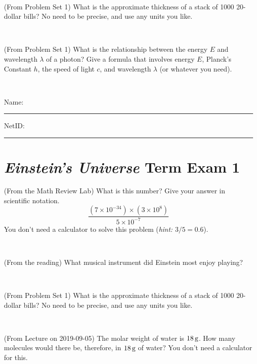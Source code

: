 \documentclass[12pt, letterpaper]{article}
\begin{document}
\vfill ~

\begin{problem} (From Problem Set 1)
What is the approximate thickness of a stack of 1000 20-dollar bills?
No need to be precise, and use any units you like.
\end{problem}


\vfill ~

\begin{problem} (From Problem Set 1)
What is the relationship between the energy $E$ and wavelength
$\lambda$ of a photon? Give a formula that involves energy $E$,
Planck's Constant $h$, the speed of light $c$, and wavelength
$\lambda$ (or whatever you need).
\end{problem}

\vfill ~


\cleardoublepage



\noindent
Name: \rule[-1ex]{0.60\textwidth}{0.1pt}
NetID: \rule[-1ex]{0.20\textwidth}{0.1pt}

\section*{\textsl{Einstein's Universe} Term Exam 1}
\setcounter{problem}{1}


\begin{problem} (From the Math Review Lab)
What is this number? Give your answer in scientific notation.
$$
\frac{(7\times10^{-34})\times(3\times10^8)}{5\times10^{-7}}
$$
You don't need a calculator to solve this problem (\textit{hint: $3/5=0.6$}).
\end{problem}


\vfill ~

\begin{problem} (From the reading)
What musical instrument did Einstein most enjoy playing?
\end{problem}


\vfill ~

\begin{problem} (From Problem Set 1)
What is the approximate thickness of a stack of 1000 20-dollar bills?
No need to be precise, and use any units you like.
\end{problem}


\vfill ~

\begin{problem} (From Lecture on 2019-09-05)
The molar weight of water is $18\,\mathrm{g}$. How many molecules would there
be, therefore, in $18\,\mathrm{g}$ of water? You don't need a calculator for
this.
\end{problem}
\end{document}
